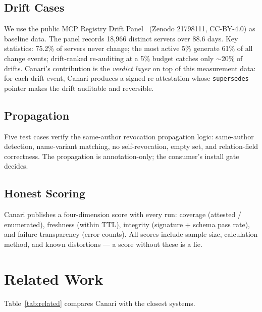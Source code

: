 \documentclass[11pt,a4paper]{article}
\begin{document}
\subsection{Drift Cases}

We use the public MCP Registry Drift Panel~\cite{drift89} (Zenodo 21798111,
CC-BY-4.0) as baseline data. The panel records 18{,}966 distinct servers over
88.6 days. Key statistics: 75.2\% of servers never change; the most active 5\%
generate 61\% of all change events; drift-ranked re-auditing at a 5\% budget
catches only $\sim$20\% of drifts. Canari's contribution is the \emph{verdict
layer} on top of this measurement data: for each drift event, Canari produces a
signed re-attestation whose \texttt{supersedes} pointer makes the drift
auditable and reversible.

\subsection{Propagation}

Five test cases verify the same-author revocation propagation logic:
same-author detection, name-variant matching, no self-revocation, empty set,
and relation-field correctness. The propagation is annotation-only; the
consumer's install gate decides.

\subsection{Honest Scoring}

Canari publishes a four-dimension score with every run:
coverage (attested / enumerated), freshness (within TTL), integrity (signature
+ schema pass rate), and failure transparency (error counts). All scores
include sample size, calculation method, and known distortions --- a score
without these is a lie.

\section{Related Work}

Table~\ref{tab:related} compares Canari with the closest systems.
\end{document}
